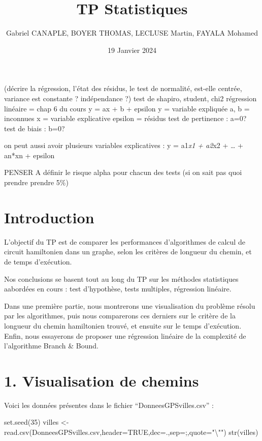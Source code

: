 \documentclass[
]{article}
\title{TP Statistiques}
\author{Gabriel CANAPLE, BOYER THOMAS, LECLUSE Martin, FAYALA Mohamed}
\date{19 Janvier 2024}
\newenvironment{Shaded}{\begin{snugshade}}{\end{snugshade}}
\newcommand{\AttributeTok}[1]{\textcolor[rgb]{0.77,0.63,0.00}{#1}}
\newcommand{\ConstantTok}[1]{\textcolor[rgb]{0.00,0.00,0.00}{#1}}
\newcommand{\DecValTok}[1]{\textcolor[rgb]{0.00,0.00,0.81}{#1}}
\newcommand{\FunctionTok}[1]{\textcolor[rgb]{0.00,0.00,0.00}{#1}}
\newcommand{\NormalTok}[1]{#1}
\newcommand{\OtherTok}[1]{\textcolor[rgb]{0.56,0.35,0.01}{#1}}
\newcommand{\SpecialCharTok}[1]{\textcolor[rgb]{0.00,0.00,0.00}{#1}}
\newcommand{\StringTok}[1]{\textcolor[rgb]{0.31,0.60,0.02}{#1}}
\begin{document}
\maketitle

(décrire la régression, l'état des résidus, le test de normalité,
est-elle centrée, variance est constante ? indépendance ?) test de
shapiro, student, chi2 régression linéaire = chap 6 du cours y = ax + b
+ epsilon y = variable expliquée a, b = inconnues x = variable
explicative epsilon = résidus test de pertinence : a=0? test de biais :
b=0?

on peut aussi avoir plusieurs variables explicatives : y = a1\emph{x1 +
a2}x2 + \ldots{} + an*xn + epsilon

PENSER A définir le risque alpha pour chacun des tests (si on sait pas
quoi prendre prendre 5\%)

\hypertarget{introduction}{%
\section{Introduction}\label{introduction}}

L'objectif du TP est de comparer les performances d'algorithmes de
calcul de circuit hamiltonien dans un graphe, selon les critères de
longueur du chemin, et de temps d'exécution.

Nos conclusions se basent tout au long du TP sur les méthodes
statistiques aabordées en cours : test d'hypothèse, tests multiples,
régression linéaire.

Dans une première partie, nous montrerons une visualisation du problème
résolu par les algorithmes, puis nous comparerons ces derniers sur le
critère de la longueur du chemin hamiltonien trouvé, et ensuite sur le
temps d'exécution. Enfin, nous essayerons de proposer une régression
linéaire de la complexité de l'algorithme Branch \& Bound.

\hypertarget{visualisation-de-chemins}{%
\section{1. Visualisation de chemins}\label{visualisation-de-chemins}}

Voici les données présentes dans le fichier ``DonneesGPSvilles.csv'' :

\begin{Shaded}
\begin{Highlighting}[]
\FunctionTok{set.seed}\NormalTok{(}\DecValTok{35}\NormalTok{)}
\NormalTok{villes }\OtherTok{\textless{}{-}} \FunctionTok{read.csv}\NormalTok{(}\StringTok{\textquotesingle{}DonneesGPSvilles.csv\textquotesingle{}}\NormalTok{,}\AttributeTok{header=}\ConstantTok{TRUE}\NormalTok{,}\AttributeTok{dec=}\StringTok{\textquotesingle{}.\textquotesingle{}}\NormalTok{,}\AttributeTok{sep=}\StringTok{\textquotesingle{};\textquotesingle{}}\NormalTok{,}\AttributeTok{quote=}\StringTok{"}\SpecialCharTok{\textbackslash{}"}\StringTok{"}\NormalTok{)}
\FunctionTok{str}\NormalTok{(villes)}
\end{Highlighting}
\end{Shaded}
\end{document}
